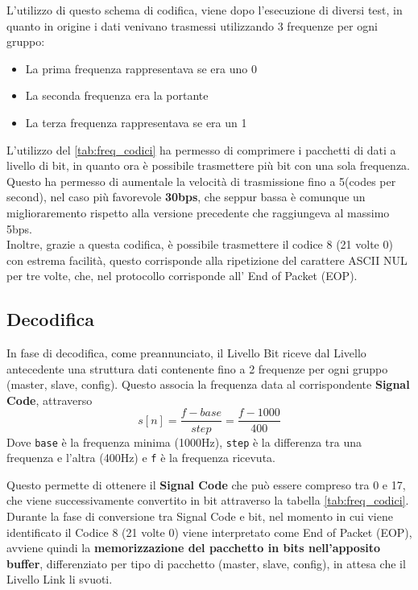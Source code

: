 L'utilizzo di questo schema di codifica, viene dopo l'esecuzione di diversi test, in quanto in origine i dati venivano trasmessi utilizzando 3 frequenze per ogni gruppo:
\begin{itemize}
\item La prima frequenza rappresentava se era uno 0
\item La seconda frequenza era la portante
\item La terza frequenza rappresentava se era un 1
\end{itemize}
L'utilizzo del \ref{tab:freq_codici} ha permesso di comprimere i pacchetti di dati a livello di bit, in quanto ora è possibile trasmettere più bit con una sola frequenza.\\
Questo ha permesso di aumentale la velocità di trasmissione fino a 5(codes per second), nel caso più favorevole \textbf{30bps}, 
che seppur bassa è comunque un miglioraremento rispetto alla versione precedente che raggiungeva al massimo 5bps.\\
Inoltre, grazie a questa codifica, è possibile trasmettere il codice 8 (21 volte 0) 
con estrema facilità, questo corrisponde alla ripetizione del carattere ASCII NUL per tre volte, che, nel protocollo corrisponde all' End of Packet (EOP).\\

\subsection{Decodifica}
In fase di decodifica, come preannunciato, il Livello Bit riceve dal Livello antecedente una struttura dati contenente fino a 2 frequenze per ogni gruppo (master, slave, config).
Questo associa la frequenza data al corrispondente \textbf{Signal Code}, attraverso
\begin{equation}
s[n] = \frac{f-base}{step} = \frac{f-1000}{400}
\end{equation}
Dove \texttt{base} è la frequenza minima (1000Hz), \texttt{step} è la differenza tra una frequenza e l'altra (400Hz) e \texttt{f} è la frequenza ricevuta.

Questo permette di ottenere il \textbf{Signal Code} che può essere compreso tra 0 e 17, che viene successivamente convertito in bit attraverso
la tabella \ref{tab:freq_codici}.\\
Durante la fase di conversione tra Signal Code e bit, nel momento in cui viene identificato il Codice 8 (21 volte 0) viene interpretato come End of Packet (EOP),
avviene quindi la \textbf{memorizzazione del pacchetto in bits nell'apposito buffer}, differenziato per tipo di pacchetto (master, slave, config), 
in attesa che il Livello Link li svuoti.\\

